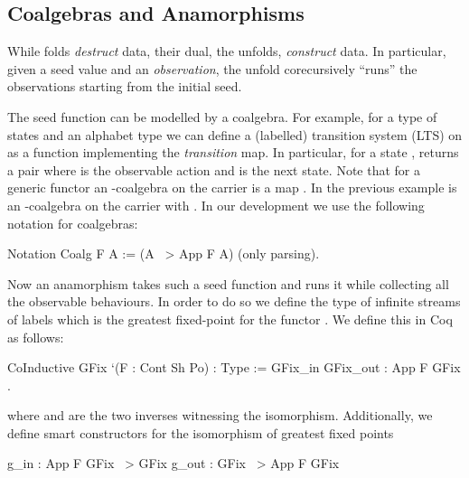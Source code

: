 \documentclass[anonymous, a4paper, UKenglish, cleveref, autoref, thm-restate]{lipics-v2021}
\begin{document}
\subsection{Coalgebras and Anamorphisms}
While folds \emph{destruct} data, their dual, the unfolds, \emph{construct}
data. In particular, given a seed value and an \emph{observation}, the unfold
corecursively  ``runs'' the observations starting from the initial seed.


The seed function can be modelled by a coalgebra. For example, for a type of
states  and an alphabet type  we can define a (labelled)
transition system (LTS) on  as a function 
implementing the \emph{transition} map. In particular, for a
state ,  returns a pair 
where  is the observable action and  is the next state.
Note that for a generic functor  an -coalgebra on the
carrier  is a map . In the previous example  is
an -coalgebra on the carrier  with .
In our development we use the following notation for coalgebras:
\begin{coqcode}
Notation Coalg F A := (A ~> App F A) (only parsing).
\end{coqcode}

Now an anamorphism takes such a seed function and runs it while collecting all
the observable behaviours. In order to do so we define the type of infinite
streams of labels which is the greatest fixed-point for the functor .
We define this in Coq as follows:
\begin{coqcode}
CoInductive GFix `(F : Cont Sh Po) : Type := GFix_in { GFix_out : App F GFix }.
\end{coqcode}
where   and  are the two inverses witnessing the
isomorphism. Additionally, we define smart constructors for the isomorphism of greatest fixed points
\begin{coqcode}
g_in : App F GFix ~> GFix
g_out : GFix ~> App F GFix
\end{coqcode}
\end{document}
